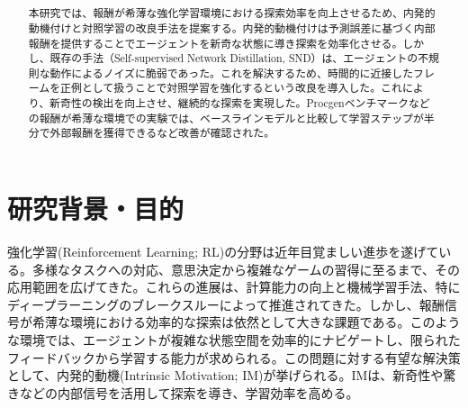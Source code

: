 \usepackage{color}
\usepackage{amsmath}
\usepackage{graphicx}
\title{
}


\author{%
\and
{}
\and
{}
}



\begin{abstract}
本研究では、報酬が希薄な強化学習環境における探索効率を向上させるため、内発的動機付けと対照学習の改良手法を提案する。内発的動機付けは予測誤差に基づく内部報酬を提供することでエージェントを新奇な状態に導き探索を効率化させる。しかし、既存の手法（Self-supervised Network Distillation, SND）は、エージェントの不規則な動作によるノイズに脆弱であった。これを解決するため、時間的に近接したフレームを正例として扱うことで対照学習を強化するという改良を導入した。これにより、新奇性の検出を向上させ、継続的な探索を実現した。Procgenベンチマークなどの報酬が希薄な環境での実験では、ベースラインモデルと比較して学習ステップが半分で外部報酬を獲得できるなど改善が確認された。
\end{abstract}

\def\Style{``jsaiac.sty''}
\def\BibTeX{{\rm B\kern-.05em{\sc i\kern-.025em b}\kern-.08em%
 T\kern-.1667em\lower.7ex\hbox{E}\kern-.125emX}}
\def\JBibTeX{\leavevmode\lower .6ex\hbox{J}\kern-0.15em\BibTeX}
\def\LaTeXe{\LaTeX\kern.15em2$_{\textstyle\varepsilon}$}


\maketitle

\section{研究背景・目的}
強化学習(Reinforcement Learning; RL)の分野は近年目覚ましい進歩を遂げている。多様なタスクへの対応、意思決定から複雑なゲームの習得に至るまで、その応用範囲を広げてきた。これらの進展は、計算能力の向上と機械学習手法、特にディープラーニングのブレークスルーによって推進されてきた。しかし、報酬信号が希薄な環境における効率的な探索は依然として大きな課題である。このような環境では、エージェントが複雑な状態空間を効率的にナビゲートし、限られたフィードバックから学習する能力が求められる。この問題に対する有望な解決策として、内発的動機(Intrinsic Motivation; IM)\cite{IM}が挙げられる。IMは、新奇性や驚きなどの内部信号を活用して探索を導き、学習効率を高める。

